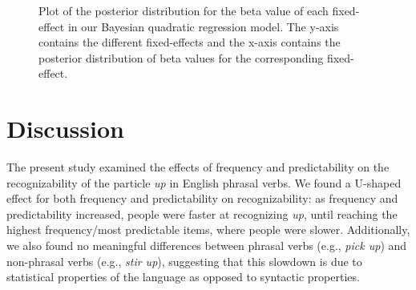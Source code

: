 \documentclass[
  12pt,
  letterpaper,
]{scrreport}
\begin{document}
\begin{figure}[htbp]

\caption{\label{fig-posteriorplotFullQuadratic}Plot of the posterior
distribution for the beta value of each fixed-effect in our Bayesian
quadratic regression model. The y-axis contains the different
fixed-effects and the x-axis contains the posterior distribution of beta
values for the corresponding fixed-effect.}


\end{figure}%

\section{Discussion}\label{discussion-4}

The present study examined the effects of frequency and predictability
on the recognizability of the particle \emph{up} in English phrasal
verbs. We found a U-shaped effect for both frequency and predictability
on recognizability: as frequency and predictability increased, people
were faster at recognizing \emph{up}, until reaching the highest
frequency/most predictable items, where people were slower.
Additionally, we also found no meaningful differences between phrasal
verbs (e.g., \emph{pick up}) and non-phrasal verbs (e.g., \emph{stir
up}), suggesting that this slowdown is due to statistical properties of
the language as opposed to syntactic properties.
\end{document}
